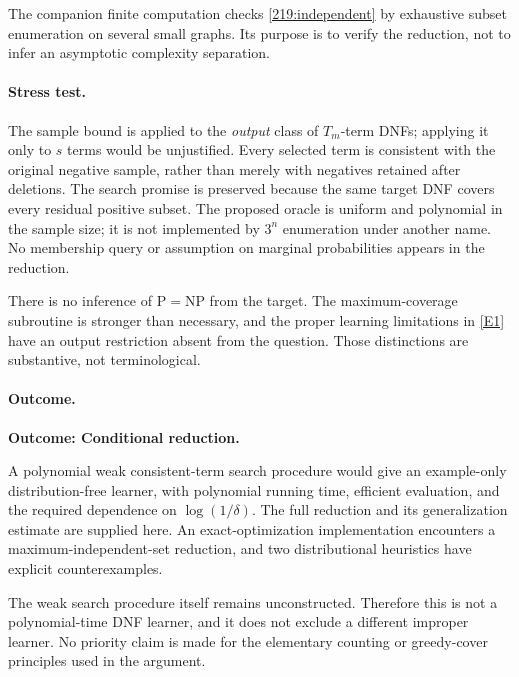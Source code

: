 \documentclass[11pt,a4paper]{article}
\newcommand{\eref}[2]{\hyperlink{extra:#1:#2}{[E#2]}}
\numberwithin{equation}{section}
\begin{document}
The companion finite computation checks \eqref{219:independent} by
exhaustive subset enumeration on several small graphs. Its purpose is to
verify the reduction, not to infer an asymptotic complexity separation.

\paragraph{Stress test.}
The sample bound is applied to the \emph{output} class of $T_m$-term
DNFs; applying it only to $s$ terms would be unjustified. Every selected
term is consistent with the original negative sample, rather than merely
with negatives retained after deletions. The search promise is preserved
because the same target DNF covers every residual positive subset.
The proposed oracle is uniform and polynomial in the sample size; it is
not implemented by $3^n$ enumeration under another name. No membership
query or assumption on marginal probabilities appears in the reduction.

There is no inference of $\mathrm P=\mathrm{NP}$ from the target. The
maximum-coverage subroutine is stronger than necessary, and the proper
learning limitations in \eref{219}{1} have an output restriction absent
from the question. Those distinctions are substantive, not terminological.

\paragraph{Outcome.}
\textbf{Outcome: Conditional reduction.}

A polynomial weak consistent-term search procedure would give an
example-only distribution-free learner, with polynomial running time,
efficient evaluation, and the required dependence on $\log(1/\delta)$.
The full reduction and its generalization estimate are supplied here.
An exact-optimization implementation encounters a maximum-independent-set
reduction, and two distributional heuristics have explicit counterexamples.

The weak search procedure itself remains unconstructed. Therefore this
is not a polynomial-time DNF learner, and it does not exclude a different
improper learner. No priority claim is made for the elementary counting
or greedy-cover principles used in the argument.
\end{document}
